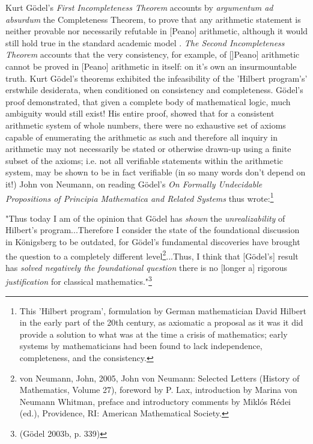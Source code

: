 \documentclass[7pt]{article}
\begin{document}
Kurt Gödel's \textit{First Incompleteness Theorem} accounts by \textit{argumentum ad absurdum} {the Completeness Theorem}, to prove that any arithmetic statement  is neither provable nor necessarily refutable in [Peano] arithmetic, although it would still hold true in the standard academic model . \textit{The Second Incompleteness Theorem} accounts that the very consistency, for example, of []Peano] arithmetic cannot be proved in [Peano] arithmetic in itself: on it's own an insurmountable truth. Kurt Gödel's theorems exhibited the infeasibility of the 'Hilbert program's' erstwhile desiderata, when conditioned on consistency and completeness. Gödel's proof demonstrated, that given a complete body of mathematical logic, much ambiguity would still exist! His entire proof, showed that for a consistent arithmetic system of whole numbers, there were no exhaustive set of axioms capable of enumerating the arithmetic as such and therefore all inquiry in arithmetic may not necessarily be stated or otherwise drawn-up using a finite subset of the axioms; i.e. not all verifiable statements within the arithmetic system, may be shown to be in fact verifiable (\textemdash in so many words don't depend on it!) John von Neumann, on reading Gödel's \textit{On Formally Undecidable Propositions of Principia Mathematica and Related Systems} thus wrote:\footnote{This  'Hilbert program', formulation by German mathematician David Hilbert in the early part of the 20th century, as  axiomatic a proposal as it was it did provide a solution to what was at the time a crisis of mathematics; early systems by mathematicians had been found to lack independence, completeness, and the consistency.}



\vspace{0.25cm}
\relax
{}\relax

"Thus today I am of the opinion that Gödel has \emph{shown} the \emph{unrealizability} of Hilbert's program...Therefore I consider the state of the foundational discussion in Königsberg to be outdated, for Gödel's fundamental discoveries have brought the question to a completely different level\footnote{von Neumann, John, 2005, John von Neumann: Selected Letters (History of Mathematics, Volume 27), foreword by P. Lax, introduction by Marina von Neumann Whitman, preface and introductory comments by Miklós Rédei (ed.), Providence, RI: American Mathematical Society.}...Thus, I think that [Gödel's] result has \emph{solved negatively the foundational question} \textemdash there is no [longer a] rigorous \emph{justification} for classical mathematics."\footnote{(Gödel 2003b, p. 339)}
\end{document}
